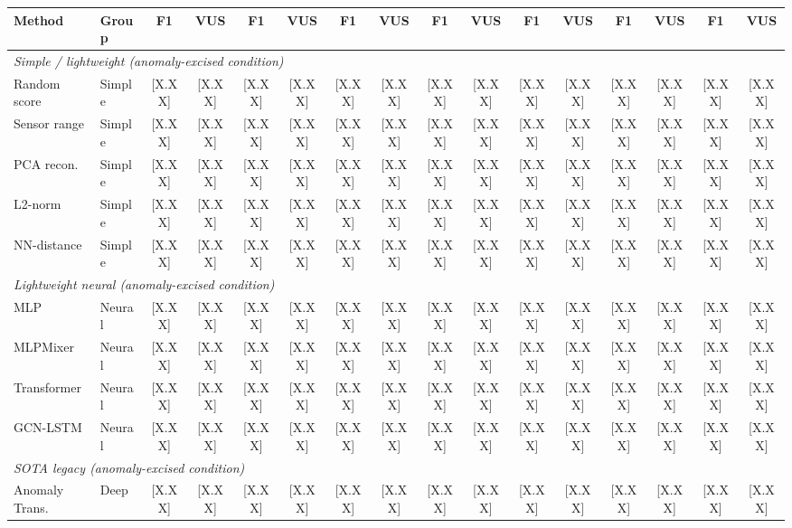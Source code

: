 \begin{table}[t]
\begin{adjustbox}{max width=\linewidth}
\begin{tabular}{l@{\hspace{4pt}}l@{\hspace{3pt}}cccccccccccccc}
\cmidrule(lr){11-12}\cmidrule(lr){13-14}\cmidrule(lr){15-16}
Method & Group & F1 & VUS & F1 & VUS & F1 & VUS & F1 & VUS & F1 & VUS & F1 & VUS & F1 & VUS \\
\midrule
\multicolumn{16}{l}{\textit{Simple / lightweight (anomaly-excised condition)}} \\
Random score & Simple & {[X.XX]} & {[X.XX]} & {[X.XX]} & {[X.XX]} & {[X.XX]} & {[X.XX]} & {[X.XX]} & {[X.XX]} & {[X.XX]} & {[X.XX]} & {[X.XX]} & {[X.XX]} & {[X.XX]} & {[X.XX]} \\
Sensor range & Simple & {[X.XX]} & {[X.XX]} & {[X.XX]} & {[X.XX]} & {[X.XX]} & {[X.XX]} & {[X.XX]} & {[X.XX]} & {[X.XX]} & {[X.XX]} & {[X.XX]} & {[X.XX]} & {[X.XX]} & {[X.XX]} \\
PCA recon.   & Simple & {[X.XX]} & {[X.XX]} & {[X.XX]} & {[X.XX]} & {[X.XX]} & {[X.XX]} & {[X.XX]} & {[X.XX]} & {[X.XX]} & {[X.XX]} & {[X.XX]} & {[X.XX]} & {[X.XX]} & {[X.XX]} \\
L2-norm      & Simple & {[X.XX]} & {[X.XX]} & {[X.XX]} & {[X.XX]} & {[X.XX]} & {[X.XX]} & {[X.XX]} & {[X.XX]} & {[X.XX]} & {[X.XX]} & {[X.XX]} & {[X.XX]} & {[X.XX]} & {[X.XX]} \\
NN-distance  & Simple & {[X.XX]} & {[X.XX]} & {[X.XX]} & {[X.XX]} & {[X.XX]} & {[X.XX]} & {[X.XX]} & {[X.XX]} & {[X.XX]} & {[X.XX]} & {[X.XX]} & {[X.XX]} & {[X.XX]} & {[X.XX]} \\
\midrule
\multicolumn{16}{l}{\textit{Lightweight neural (anomaly-excised condition)}} \\
MLP          & Neural & {[X.XX]} & {[X.XX]} & {[X.XX]} & {[X.XX]} & {[X.XX]} & {[X.XX]} & {[X.XX]} & {[X.XX]} & {[X.XX]} & {[X.XX]} & {[X.XX]} & {[X.XX]} & {[X.XX]} & {[X.XX]} \\
MLPMixer     & Neural & {[X.XX]} & {[X.XX]} & {[X.XX]} & {[X.XX]} & {[X.XX]} & {[X.XX]} & {[X.XX]} & {[X.XX]} & {[X.XX]} & {[X.XX]} & {[X.XX]} & {[X.XX]} & {[X.XX]} & {[X.XX]} \\
Transformer  & Neural & {[X.XX]} & {[X.XX]} & {[X.XX]} & {[X.XX]} & {[X.XX]} & {[X.XX]} & {[X.XX]} & {[X.XX]} & {[X.XX]} & {[X.XX]} & {[X.XX]} & {[X.XX]} & {[X.XX]} & {[X.XX]} \\
GCN-LSTM     & Neural & {[X.XX]} & {[X.XX]} & {[X.XX]} & {[X.XX]} & {[X.XX]} & {[X.XX]} & {[X.XX]} & {[X.XX]} & {[X.XX]} & {[X.XX]} & {[X.XX]} & {[X.XX]} & {[X.XX]} & {[X.XX]} \\
\midrule
\multicolumn{16}{l}{\textit{SOTA legacy (anomaly-excised condition)}} \\
Anomaly Trans. & Deep & {[X.XX]} & {[X.XX]} & {[X.XX]} & {[X.XX]} & {[X.XX]} & {[X.XX]} & {[X.XX]} & {[X.XX]} & {[X.XX]} & {[X.XX]} & {[X.XX]} & {[X.XX]} & {[X.XX]} & {[X.XX]} \\

\end{tabular}
\end{adjustbox}
\end{table}
